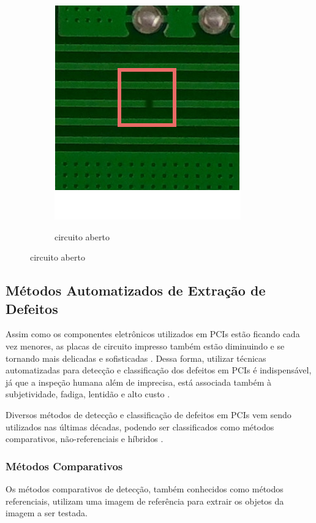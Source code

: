 \begin{figure}[H]
\begin{subfigure}[H]{0.3\textwidth}
        \label{fig:fund-defeitos4}
    \end{subfigure}
    \begin{subfigure}[H]{0.3\textwidth}
        \centering
        \caption{circuito aberto}
        \includegraphics[scale=0.6]{img/img-fundamentacao-defeitos6.pdf}
        \label{fig:fund-defeitos6}
    \end{subfigure}
	\label{fig:fund-defeitos}
\end{figure}

\subsection{Métodos Automatizados de Extração de Defeitos} \label{cap:fund-pcb-metodos}

Assim como os componentes eletrônicos utilizados em PCIs estão ficando cada vez menores, as placas de circuito impresso também estão diminuindo e se tornando mais delicadas e sofisticadas \cite{ref:Hu-Wang}. Dessa forma, utilizar técnicas automatizadas para detecção e classificação dos defeitos em PCIs é indispensável, já que a inspeção humana além de imprecisa, está associada também à subjetividade, fadiga, lentidão e alto custo \cite{ref:Leta-Feliciano-Martins}.

Diversos métodos de detecção e classificação de defeitos em PCIs vem sendo utilizados nas últimas décadas, podendo ser classificados como métodos comparativos, não-referenciais e híbridos .

\subsubsection{Métodos Comparativos} \label{cap:fund-pcb-metodos-comp}
Os métodos comparativos de detecção, também conhecidos como métodos referenciais, utilizam uma imagem de referência para extrair os objetos da imagem a ser testada.

